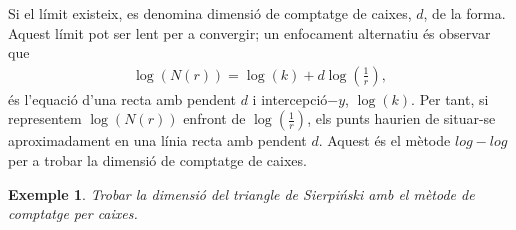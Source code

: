 \documentclass[12pt,a4paper]{report}
\newtheorem{eje}{Exemple}[chapter]
\begin{document}
Si el límit existeix, es denomina dimensió de comptatge de caixes, $d$, de la forma. Aquest límit pot ser lent per a convergir; un enfocament alternatiu és observar que
\begin{align*}
\log(N(r))  = \log(k) + d\log\left(\frac{1}{r}\right), 
\end{align*}
és l'equació d'una recta amb pendent $d$ i intercepció$-y$, $\log(k)$. Per tant, si representem $\log(N(r))$ enfront de $\displaystyle\log\left(\frac{1}{r}\right)$, els punts haurien de situar-se aproximadament en una línia recta amb pendent $d$. Aquest és el mètode $log-log$ per a trobar la dimensió de comptatge de caixes.

\begin{eje}
Trobar la dimensió del triangle de Sierpiński amb el mètode de comptatge per caixes.
\end{eje}
\end{document}
